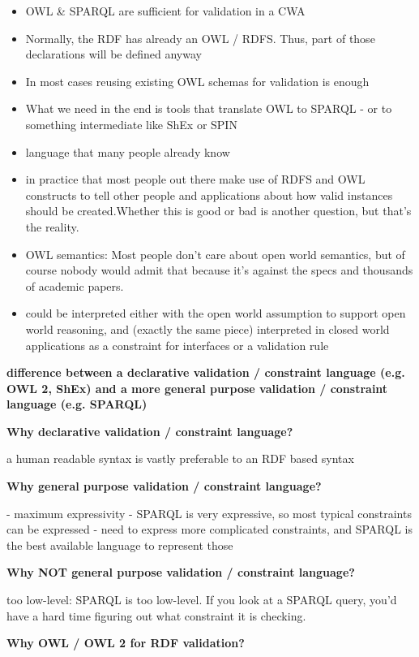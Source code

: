 \documentclass{llncs}
\begin{document}
\begin{itemize}
	\item OWL & SPARQL are sufficient for validation in a CWA
	\item Normally, the RDF has already an OWL / RDFS. Thus, part of those declarations will be defined anyway
	\item In most cases reusing existing OWL schemas for validation is enough
	\item What we need in the end is tools that translate OWL to SPARQL - or to something intermediate like ShEx or SPIN
	\item language that many people already know
	\item in practice that most people out there make use of RDFS and OWL constructs to tell other people and applications about how valid instances should be created.Whether this is good or bad is another question, but that's the reality.
	\item OWL semantics:
Most people don't care about open world semantics, but of course nobody would admit that because it's against the specs and thousands of academic papers.
	\item could be interpreted either with the open world assumption to support open world reasoning, and (exactly the same piece) interpreted in closed world applications as a constraint for interfaces or a validation rule
\end{itemize}


\textbf{difference between a declarative validation / constraint language (e.g. OWL 2, ShEx) and a more general purpose validation / constraint language (e.g. SPARQL)}


\textbf{Why declarative validation / constraint language?}

a human readable syntax is vastly preferable to an RDF based syntax

\textbf{Why general purpose validation / constraint language?}

- maximum expressivity
	- SPARQL is very expressive, so most typical constraints can be expressed
	- need to express more complicated constraints, and SPARQL is the best available language to represent those

\textbf{Why NOT general purpose validation / constraint language?}

too low-level:
SPARQL is too low-level. If you look at a SPARQL query, you'd have a hard time figuring out what constraint it is checking.

\textbf{Why OWL / OWL 2 for RDF validation?}
\end{document}
